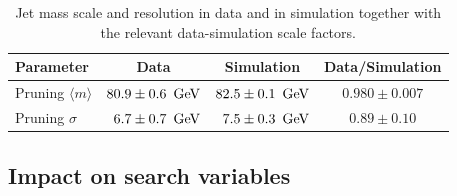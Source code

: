 \begin{table}[!htb]
 \begin{center}

 \begin{tabular}{|l|c|c|c}
  Parameter & Data & Simulation & Data/Simulation \\
  \hline
  Pruning $\langle m \rangle$ &$80.9 \pm 0.6~{\rm \,\text{Ge\hspace{-.08em}V}}$   & $82.5 \pm 0.1~{\rm \,\text{Ge\hspace{-.08em}V}}$  & $0.980 \pm 0.007$ \\
  Pruning $\sigma$            & \ $6.7 \pm 0.7~{\rm \,\text{Ge\hspace{-.08em}V}}$ & \ $7.5 \pm 0.3~{\rm \,\text{Ge\hspace{-.08em}V}}$ & $0.89 \pm 0.10$ \\
  \hline
 \end{tabular}
 \caption{Jet mass scale and resolution in data and in simulation together with the relevant data-simulation scale factors.}
 \label{tab:searchI:params}
 \end{center}
\end{table}

\subsection{Impact on search variables}
\label{sec:searchI:wtagimpact}

